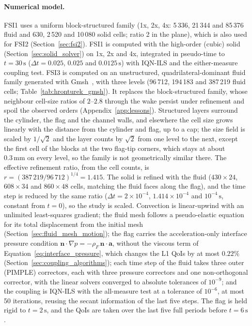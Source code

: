 \paragraph{Numerical model.}
FSI1 uses a uniform block-structured family (1x, 2x, 4x: 5\,336, 21\,344 and 85\,376 fluid and 630, 2\,520 and 10\,080 solid cells; ratio 2 in the plane), which is also used for FSI2 (Section~\ref{sec:fsi2}).
FSI1 is computed with the high-order (cubic) solid (Section~\ref{sec:solid_solver}) on 1x, 2x and 4x, integrated in pseudo-time to $t = 30\,\mathrm{s}$ ($\Delta t = 0.025$, $0.025$ and $0.0125\,\mathrm{s}$) with IQN-ILS and the either-measure coupling test.
FSI3 is computed on an unstructured, quadrilateral-dominant fluid family generated with Gmsh~\citep{geuzaine2009gmsh}, with three levels (96\,712, 194\,183 and 387\,219 fluid cells; Table~\ref{tab:hronturek_gmsh}). It replaces the block-structured family, whose neighbour cell-size ratios of $2$--$2.8$ through the wake persist under refinement and spoil the observed orders (Appendix~\ref{app:lessons}). Structured layers surround the cylinder, the flag and the channel walls, and elsewhere the cell size grows linearly with the distance from the cylinder and flag, up to a cap; the size field is scaled by $1/\sqrt{2}$ and the layer counts by $\sqrt{2}$ from one level to the next, except the first cell of the blocks at the two flag-tip corners, which stays at about $0.3\,\mathrm{mm}$ on every level, so the family is not geometrically similar there. The effective refinement ratio, from the cell counts, is $r = (387\,219/96\,712)^{1/4} = 1.415$. The solid is refined with the fluid ($430\times24$, $608\times34$ and $860\times48$ cells, matching the fluid faces along the flag), and the time step is reduced by the same ratio ($\Delta t = 2\times10^{-4}$, $1.414\times10^{-4}$ and $10^{-4}\,\mathrm{s}$, constant from $t = 0$), so the study is scaled. Convection is linear-upwind with an unlimited least-squares gradient; the fluid mesh follows a pseudo-elastic equation for its total displacement from the initial mesh (Section~\ref{sec:fluid_mesh_motion}); the flag carries the acceleration-only interface pressure condition $\mathbf{n}\cdot\nabla p = -\rho_F\,\mathbf{n}\cdot\mathbf{a}$, without the viscous term of Equation~\eqref{eq:interface_pressure}, which changes the L1 QoIs by at most $0.22\%$ (Section~\ref{sec:coupling_algorithms}); each time step of the fluid takes three outer (PIMPLE) correctors, each with three pressure correctors and one non-orthogonal corrector, with the linear solvers converged to absolute tolerances of $10^{-9}$; and the coupling is IQN-ILS with the all-measure test at a tolerance of $10^{-6}$, at most 50 iterations, reusing the secant information of the last five steps. The flag is held rigid to $t = 2\,\mathrm{s}$, and the QoIs are taken over the last five full periods before $t = 6\,\mathrm{s}$.

